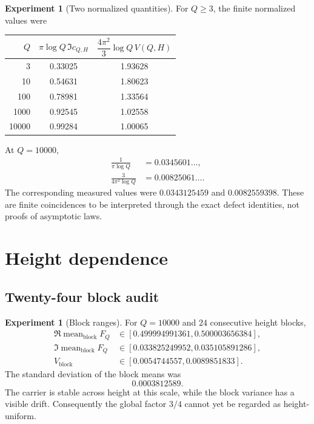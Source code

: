 \documentclass[11pt]{amsart}
\numberwithin{equation}{section}
\theoremstyle{plain}
\theoremstyle{definition}
\newtheorem{experiment}[theorem]{Experiment}
\theoremstyle{remark}
\newcommand{\1}{\mathbf{1}}
\begin{document}
\begin{experiment}[Two normalized quantities]
\label{exp:numerical_normalized_quantities}
For $Q\geq3$, the finite normalized values were
\begin{center}
\begin{tabular}{rcc}
\toprule
$Q$ & $\pi\log Q\,\Im c_{Q,H}$ &
$\dfrac{4\pi^2}{3}\log Q\,V(Q,H)$\\
\midrule
3 & 0.33025 & 1.93628\\
10 & 0.54631 & 1.80623\\
100 & 0.78981 & 1.33564\\
1000 & 0.92545 & 1.02558\\
10000 & 0.99284 & 1.00065\\
\bottomrule
\end{tabular}
\end{center}
At $Q=10000$,
\begin{align}
\frac1{\pi\log Q}
&=0.0345601\ldots,
\label{eq:numerical_imag_prediction}
\\
\frac3{4\pi^2\log Q}
&=0.00825061\ldots.
\label{eq:numerical_variance_prediction}
\end{align}
The corresponding measured values were
$0.0343125459$ and $0.0082559398$.  These are finite coincidences to be
interpreted through the exact defect identities, not proofs of asymptotic
laws.
\end{experiment}

\section{Height dependence}
\label{sec:numerical_height_dependence}

\subsection{Twenty-four block audit}
\label{subsec:numerical_block_audit}

\begin{experiment}[Block ranges]
\label{exp:numerical_block_ranges}
For $Q=10000$ and $24$ consecutive height blocks,
\begin{align}
\Re\operatorname{mean}_{\mathrm{block}}F_Q
&\in[0.499994991361,0.500003656384],
\label{eq:numerical_block_real_range_detailed}
\\
\Im\operatorname{mean}_{\mathrm{block}}F_Q
&\in[0.033825249952,0.035105891286],
\label{eq:numerical_block_imag_range_detailed}
\\
V_{\mathrm{block}}
&\in[0.0054744557,0.0089851833].
\label{eq:numerical_block_var_range_detailed}
\end{align}
The standard deviation of the block means was
\begin{equation}
0.0003812589.
\label{eq:numerical_block_mean_std}
\end{equation}
The carrier is stable across height at this scale, while the block variance
has a visible drift.  Consequently the global factor $3/4$ cannot yet be
regarded as height-uniform.
\end{experiment}
\end{document}
